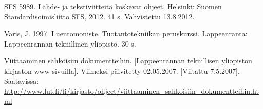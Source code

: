 \documentclass{LUT_pohja}[2016/03/09 LUT Dippa Pohja]
\begin{document}
\begin{thebibliography}{99}
SFS 5989. Lähde- ja tekstiviitteitä koskevat ohjeet. Helsinki: Suomen Standardisoimisliitto 
SFS, 2012. 41 s. Vahvistettu 13.8.2012. 

Varis, J. 1997. Luentomoniste, Tuotantotekniikan peruskurssi. Lappeenranta: Lappeenrannan teknillinen yliopisto. 30 s. 

Viittaaminen sähköisiin dokumentteihin. [Lappeenrannan teknillisen yliopiston kirjaston 
www-sivuilla].  Viimeksi  päivitetty  02.05.2007.  [Viitattu  7.5.2007].  Saatavissa:
\url{http://www.lut.fi/fi/kirjasto/ohjeet/viittaaminen_sahkoisiin_dokumentteihin.html}
\end{thebibliography}


\TempTalteen
\end{document}

